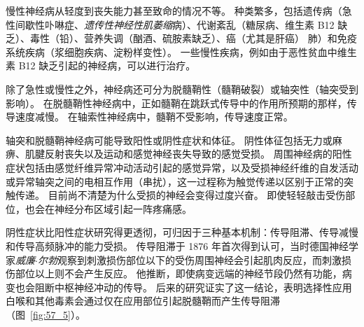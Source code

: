 慢性神经病从轻度到丧失能力甚至致命的情况不等。
种类繁多，包括遗传病（急性间歇性卟啉症、\textit{遗传性神经性肌萎缩}病）、代谢紊乱（糖尿病、维生素 B12 缺乏）、毒性（铅）、营养失调（酗酒、硫胺素缺乏）、癌（尤其是肝癌） 肺）和免疫系统疾病（浆细胞疾病、淀粉样变性）。
一些慢性疾病，例如由于恶性贫血中维生素 B12 缺乏引起的神经病，可以进行治疗。


除了急性或慢性之外，神经病还可分为脱髓鞘性（髓鞘破裂）或轴突性（轴突受到影响）。
在脱髓鞘性神经病中，正如髓鞘在跳跃式传导中的作用所预期的那样，传导速度减慢。
在轴索性神经病中，髓鞘不受影响，传导速度正常。


轴突和脱髓鞘神经病可能导致阳性或阴性症状和体征。
阴性体征包括无力或麻痹、肌腱反射丧失以及运动和感觉神经丧失导致的感觉受损。
周围神经病的阳性症状包括由感觉纤维异常冲动活动引起的感觉异常，以及受损神经纤维的自发活动或异常轴突之间的电相互作用（串扰），这一过程称为触觉传递以区别于正常的突触传递。
目前尚不清楚为什么受损的神经会变得过度兴奋。
即使轻轻敲击受伤部位，也会在神经分布区域引起一阵疼痛感。


阴性症状比阳性症状研究得更透彻，可归因于三种基本机制：传导阻滞、传导减慢和传导高频脉冲的能力受损。
传导阻滞于 1876 年首次得到认可，当时德国神经学家\textit{威廉$\cdot$尔勃}观察到刺激损伤部位以下的受伤周围神经会引起肌肉反应，而刺激损伤部位以上则不会产生反应。
他推断，即使病变远端的神经节段仍然有功能，病变也会阻断中枢神经冲动的传导。
后来的研究证实了这一结论，表明选择性应用白喉和其他毒素会通过仅在应用部位引起脱髓鞘而产生传导阻滞（图~\ref{fig:57_5}）。


